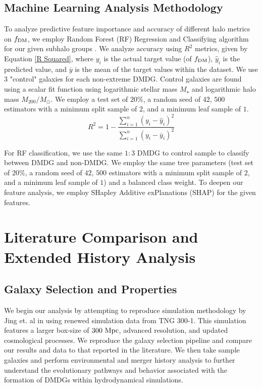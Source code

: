 \documentclass[twocolumn]{openjournal}
\begin{document}
\subsection{Machine Learning Analysis Methodology} \label{Machine Learning Analysis Methodology}
To analyze predictive feature importance and accuracy of different halo metrics on $f_\textup{DM}$, we employ Random Forest (RF) Regression and Classifying algorithm for our given subhalo groups \cite{sciKitLearn}. We analyze accuracy using $R^2$ metrics, given by Equation \ref{R Squared}, where $y_i$ is the actual target value (of $f_\textup{DM}$), $\hat{y}_i$ is the predicted value, and $\overline{y}$ is the mean of the target values within the dataset. We use $3$ "control" galaxies for each non-extreme DMDG. Control galaxies are found using a scalar fit function \cite{scikit-learn} using logarithmic stellar mass $M_\star$ and logarithmic halo mass $M_{200}/M_\odot$. We employ a test set of $20\%$, a random seed of $42$, $500$ estimators with a minimum split sample of $2$, and a minimum leaf sample of $1$. 
\begin{equation}
\label{R Squared}
R^2=1-\frac{\sum_{i=1}^n (y_i-\hat{y}_i)^2}{\sum_{i=1}^n(y_i-\overline{y}_i)^2}
\end{equation}

For RF classification, we use the same $1:3$ DMDG to control sample to classify between DMDG and non-DMDG. We employ the same tree parameters (test set of $20\%$, a random seed of $42$, $500$ estimators with a minimum split sample of $2$, and a minimum leaf sample of $1$) and a balanced class weight. To deepen our feature analysis, we employ SHapley Additive exPlanations (SHAP) \cite{DBLP:journals/corr/LundbergL17} for the given features. 

\section{Literature Comparison and Extended History Analysis}  \label{Literature Comparisson and Extended History Analysis}
\subsection{Galaxy Selection and Properties} \label{Galaxy Selection and Properties}
We begin our analysis by attempting to reproduce simulation methodology by Jing et. al in \cite{Jing_2019} using renewed simulation data from TNG 300-1. This simulation features a larger box-size of $300 \textup{ Mpc}$, advanced resolution, and updated cosmological processes. We reproduce the galaxy selection pipeline and compare our results and data to that reported in the literature. We then take sample galaxies and perform environmental and merger history analysis to further understand the evolutionary pathways and behavior associated with the formation of DMDGs within hydrodynamical simulations. 
\end{document}

